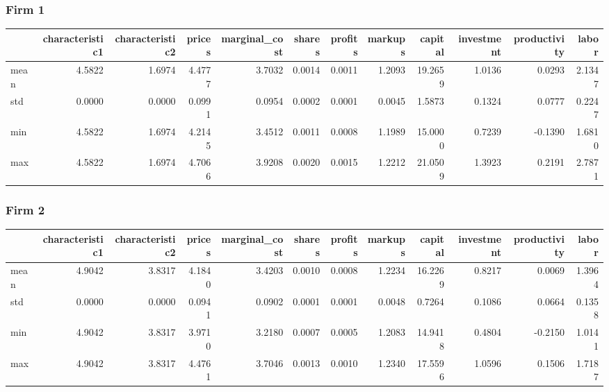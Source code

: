  \subsubsection*{Firm 1}
\begin{tabular}{lrrrrrrrrrrr}
\toprule
{} &  characteristic1 &  characteristic2 &  prices &  marginal\_cost &  shares &  profits &  markups &  capital &  investment &  productivity &  labor \\
\midrule
mean &           4.5822 &           1.6974 &  4.4777 &         3.7032 &  0.0014 &   0.0011 &   1.2093 &  19.2659 &      1.0136 &        0.0293 & 2.1347 \\
std  &           0.0000 &           0.0000 &  0.0991 &         0.0954 &  0.0002 &   0.0001 &   0.0045 &   1.5873 &      0.1324 &        0.0777 & 0.2247 \\
min  &           4.5822 &           1.6974 &  4.2145 &         3.4512 &  0.0011 &   0.0008 &   1.1989 &  15.0000 &      0.7239 &       -0.1390 & 1.6810 \\
max  &           4.5822 &           1.6974 &  4.7066 &         3.9208 &  0.0020 &   0.0015 &   1.2212 &  21.0509 &      1.3923 &        0.2191 & 2.7871 \\
\bottomrule
\end{tabular}


 \subsubsection*{Firm 2}
\begin{tabular}{lrrrrrrrrrrr}
\toprule
{} &  characteristic1 &  characteristic2 &  prices &  marginal\_cost &  shares &  profits &  markups &  capital &  investment &  productivity &  labor \\
\midrule
mean &           4.9042 &           3.8317 &  4.1840 &         3.4203 &  0.0010 &   0.0008 &   1.2234 &  16.2269 &      0.8217 &        0.0069 & 1.3964 \\
std  &           0.0000 &           0.0000 &  0.0941 &         0.0902 &  0.0001 &   0.0001 &   0.0048 &   0.7264 &      0.1086 &        0.0664 & 0.1358 \\
min  &           4.9042 &           3.8317 &  3.9710 &         3.2180 &  0.0007 &   0.0005 &   1.2083 &  14.9418 &      0.4804 &       -0.2150 & 1.0141 \\
max  &           4.9042 &           3.8317 &  4.4761 &         3.7046 &  0.0013 &   0.0010 &   1.2340 &  17.5596 &      1.0596 &        0.1506 & 1.7187 \\
\bottomrule
\end{tabular}


